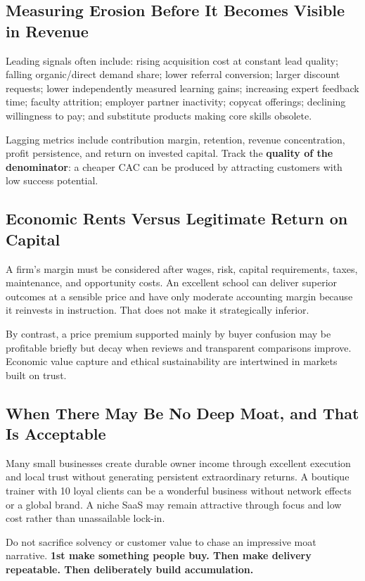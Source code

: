 \subsection{Measuring Erosion Before It Becomes Visible in Revenue}
\label{sec:measuring_erosion_before_revenue}

Leading signals often include: rising acquisition cost at constant lead quality; falling organic/direct demand share; lower referral conversion; larger discount requests; lower independently measured learning gains; increasing expert feedback time; faculty attrition; employer partner inactivity; copycat offerings; declining willingness to pay; and substitute products making core skills obsolete.

Lagging metrics include contribution margin, retention, revenue concentration, profit persistence, and return on invested capital. Track the \textbf{quality of the denominator}: a cheaper CAC can be produced by attracting customers with low success potential.

\subsection{Economic Rents Versus Legitimate Return on Capital}
\label{sec:economic_rents_vs_return_on_capital}

A firm's margin must be considered after wages, risk, capital requirements, taxes, maintenance, and opportunity costs. An excellent school can deliver superior outcomes at a sensible price and have only moderate accounting margin because it reinvests in instruction. That does not make it strategically inferior.

By contrast, a price premium supported mainly by buyer confusion may be profitable briefly but decay when reviews and transparent comparisons improve. Economic value capture and ethical sustainability are intertwined in markets built on trust.

\subsection{When There May Be No Deep Moat, and That Is Acceptable}
\label{sec:when_no_deep_moat_acceptable}

Many small businesses create durable owner income through excellent execution and local trust without generating persistent extraordinary returns. A boutique trainer with 10 loyal clients can be a wonderful business without network effects or a global brand. A niche SaaS may remain attractive through focus and low cost rather than unassailable lock-in.

Do not sacrifice solvency or customer value to chase an impressive moat narrative. \textbf{1st make something people buy. Then make delivery repeatable. Then deliberately build accumulation.}
